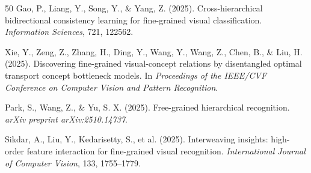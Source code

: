 \documentclass[pdflatex,sn-mathphys-num]{sn-jnl}
\theoremstyle{thmstyleone}%
\theoremstyle{thmstyletwo}%
\theoremstyle{thmstylethree}%
\begin{document}
\begin{thebibliography}{50}
 Gao, P., Liang, Y., Song, Y., \& Yang, Z. (2025). Cross-hierarchical bidirectional consistency learning for fine-grained visual classification. \textit{Information Sciences}, 721, 122562.

 Xie, Y., Zeng, Z., Zhang, H., Ding, Y., Wang, Y., Wang, Z., Chen, B., \& Liu, H. (2025). Discovering fine-grained visual-concept relations by disentangled optimal transport concept bottleneck models. In \textit{Proceedings of the IEEE/CVF Conference on Computer Vision and Pattern Recognition}.

 Park, S., Wang, Z., \& Yu, S. X. (2025). Free-grained hierarchical recognition. \textit{arXiv preprint arXiv:2510.14737}.

 Sikdar, A., Liu, Y., Kedarisetty, S., et al. (2025). Interweaving insights: high-order feature interaction for fine-grained visual recognition. \textit{International Journal of Computer Vision}, 133, 1755--1779.
\end{thebibliography}
\end{document}
